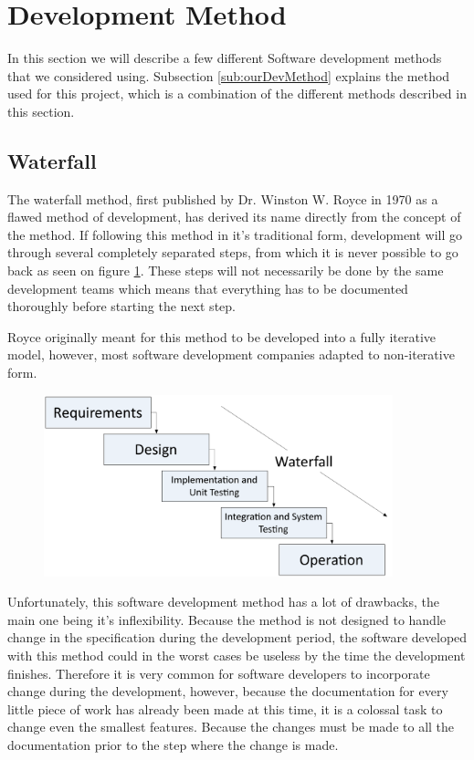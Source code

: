 \section{Development Method}
\label{sec:DevelopmentMethods}
In this section we will describe a few different Software development methods that we considered using.
Subsection \ref{sub:ourDevMethod} explains the method used for this project, which is a combination of the different methods described in this section.

\subsection{Waterfall}
The waterfall method, first published by Dr. Winston W. Royce in 1970 as a flawed method of development, has derived its name directly from the concept of the method. If following this method in it's traditional form, development will go through several completely separated steps, from which it is never possible to go back as seen on figure \ref{fig:WaterfallPic}. These steps will not necessarily be done by the same development teams which means that everything has to be documented thoroughly before starting the next step.

Royce originally meant for this method to be developed into a fully iterative model, however, most software development companies adapted to non-iterative form.
\cite{waterfallroyce}

\begin{figure}[H]
	\centering
		\includegraphics[width=0.90\textwidth]{input/implementation/development/waterfall.pdf}
	\label{fig:WaterfallPic}
\end{figure}

Unfortunately, this software development method has a lot of drawbacks, the main one being it's inflexibility.
Because the method is not designed to handle change in the specification during the development period, the software developed with this method could in the worst cases be useless by the time the development finishes.
Therefore it is very common for software developers to incorporate change during the development, however, because the documentation for every little piece of work has already been made at this time, it is a colossal task to change even the smallest features.
Because the changes must be made to all the documentation prior to the step where the change is made. 

